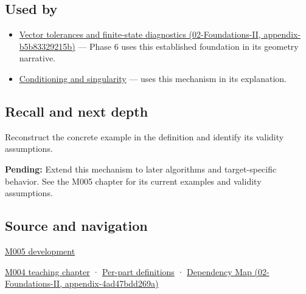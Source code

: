 \subsection{Used by}\label{appendix-0ec599f8ba27-used-by}

\begin{itemize}
\item
  \href{../02-Foundations-II/main.pdf\#nameddest=appendix-b5b83329215b}{Vector tolerances and finite-state diagnostics (02-Foundations-II, appendix-b5b83329215b)} --- Phase 6 uses this established foundation in its geometry narrative.
\item
  \hyperref[appendix-8f6a01f284a7]{Conditioning and singularity} --- uses this mechanism in its explanation.
\end{itemize}

\subsection{Recall and next depth}\label{appendix-0ec599f8ba27-recall-and-next-depth}

Reconstruct the concrete example in the definition and identify its validity assumptions.

\textbf{Pending:} Extend this mechanism to later algorithms and target-specific behavior. See the M005 chapter for its current examples and validity assumptions.

\subsection{Source and navigation}\label{appendix-0ec599f8ba27-source-and-navigation}

\hyperref[01-foundations-i-ch001-when-arithmetic-meets-uncertainty]{M005 development}

\hyperref[01-foundations-i-ch001-a-stretching-ruler-for-real-valued-quantities]{M004 teaching chapter} · \hyperref[appendix-fd090d982a15-m004---parts-61-76]{Per-part definitions} · \href{../02-Foundations-II/main.pdf\#nameddest=appendix-4ad47bdd269a}{Dependency Map (02-Foundations-II, appendix-4ad47bdd269a)}

